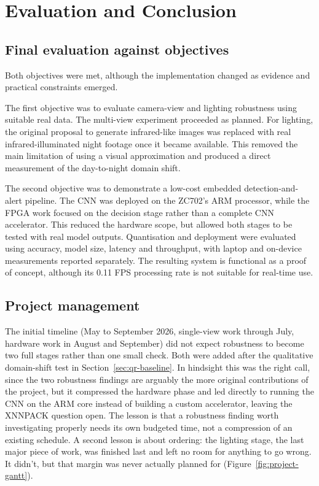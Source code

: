 
\chapter{Evaluation and Conclusion}
\label{ch:evaluation}

\section{Final evaluation against objectives}
\label{sec:eval-objectives}

Both objectives were met, although the implementation changed as evidence and practical constraints emerged.

The first objective was to evaluate camera-view and lighting robustness using suitable real data. The multi-view experiment proceeded as planned. For lighting, the original proposal to generate infrared-like images was replaced with real infrared-illuminated night footage once it became available. This removed the main limitation of using a visual approximation and produced a direct measurement of the day-to-night domain shift.

The second objective was to demonstrate a low-cost embedded detection-and-alert pipeline. The CNN was deployed on the ZC702's ARM processor, while the FPGA work focused on the decision stage rather than a complete CNN accelerator. This reduced the hardware scope, but allowed both stages to be tested with real model outputs. Quantisation and deployment were evaluated using accuracy, model size, latency and throughput, with laptop and on-device measurements reported separately. The resulting system is functional as a proof of concept, although its 0.11 FPS processing rate is not suitable for real-time use.

\section{Project management}

The initial timeline (May to September 2026, single-view work through July, hardware work in August and September) did not expect robustness to become two full stages rather than one small check. Both were added after the qualitative domain-shift test in Section~\ref{sec:qr-baseline}. In hindsight this was the right call, since the two robustness findings are arguably the more original contributions of the project, but it compressed the hardware phase and led directly to running the CNN on the ARM core instead of building a custom accelerator, leaving the XNNPACK question open. The lesson is that a robustness finding worth investigating properly needs its own budgeted time, not a compression of an existing schedule. A second lesson is about ordering: the lighting stage, the last major piece of work, was finished last and left no room for anything to go wrong. It didn't, but that margin was never actually planned for (Figure~\ref{fig:project-gantt}).

